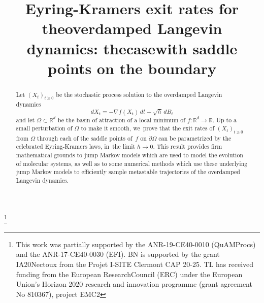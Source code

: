 \documentclass[JEP,XML,SOM,Unicode,NoEqCountersInSection,NoFloatCountersInSection,published]{cedram}
\theoremstyle{plain}
\theoremstyle{definition}
\begin{document}
\title[Eyring-Kramers exit rates for the overdamped Langevin dynamics]{Eyring-Kramers exit rates for the\nobreakspace overdamped Langevin dynamics: the\nobreakspace case\nobreakspace with saddle points on the boundary}

\author[\initial{T.} \lastname{Lelièvre}]{ }
\address{École Nationale des Ponts et Chaussées - Institut Polytechnique de Paris, CERMICS \& Inria,\\
6 et 8 avenue Blaise Pascal, Cité Descartes, Champs-sur-Marne,
77455 Marne-la-Vallée Cedex 2, France}

\author[\initial{D.} \lastname{Le Peutrec}]{ }
\address{Laboratoire de Mathématiques Jean Leray, Nantes Université,\\
2 Chemin de la Houssinière, 44 322 Nantes Cedex 3, France}

\author[\initial{B.} \lastname{Nectoux}]{ }
\address{Université Clermont Auvergne, LMBP,\\
Avenue des landais, 63177 Aubiere cedex, France}

\thanks{This work was partially supported by the ANR-19-CE40-0010 (QuAMProcs) and the ANR-17-CE40-0030 (EFI). BN is supported by the grant IA20Nectoux from the Projet I-SITE Clermont CAP 20-25. TL has received funding from the European ResearchCouncil (ERC) under the European Union’s Horizon 2020 research and innovation programme (grant agreement No 810367), project EMC2}

\begin{abstract}
Let $(X_t)_{t\ge 0}$ be the stochastic process solution to the overdamped Langevin dynamics
\[
dX_t=-\nabla f(X_t) \, dt +\sqrt h \, dB_t
\]
and let $\Omega \subset \mathbb R^d $ be the basin of attraction of a local minimum of $f: \mathbb R^d \to \mathbb R$. Up to a small perturbation of $\Omega$ to make it smooth, we~prove that the exit rates of $(X_t)_{t\ge 0}$ from $\Omega$ through each of the saddle points of~$f$ on $\partial \Omega$ can be parametrized by the celebrated Eyring-Kramers laws, in~the limit $h \to 0$. This result provides firm mathematical grounds to jump Markov models which are used to model the evolution of molecular systems, as well as to some numerical methods which use these underlying jump Markov models to efficiently sample metastable trajectories of the overdamped Langevin dynamics.
\end{abstract}
\end{document}
